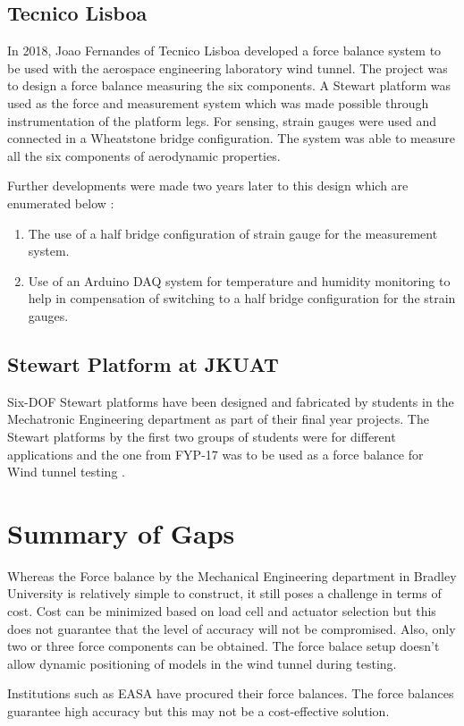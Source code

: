 \subsection{Tecnico Lisboa}
In 2018, Joao Fernandes of Tecnico Lisboa developed a force balance system to
be used with the aerospace engineering laboratory wind tunnel. The project was to
design a force balance measuring the six components. A Stewart platform was used as the
force and measurement system which was made possible through instrumentation of the platform legs.
For sensing, strain gauges were used and connected in a Wheatstone bridge configuration.
The system was able to measure all the six components of aerodynamic properties\cite{ferreira2015design}.

Further developments were made two years later to this design which are enumerated below \cite{ferreira2015design}:
\begin{enumerate}
\item The use of a half bridge configuration of strain gauge for the measurement system.
\item Use of an Arduino DAQ system for temperature and humidity monitoring to help in
compensation of switching to a half bridge configuration for the strain gauges.
\end{enumerate}
\subsection{Stewart Platform at JKUAT}
Six-DOF Stewart platforms have been designed and fabricated by students in the Mechatronic Engineering department as part of their final year projects. The Stewart platforms by the first two groups of students were for different applications and the one from FYP-17 was to be used as a force balance for Wind tunnel testing \cite{caleb}. 
\section{Summary of Gaps}
Whereas the Force balance by the Mechanical Engineering department in Bradley University is relatively simple to construct, it still poses a challenge in terms of cost. Cost can be minimized based on load cell and actuator selection but this does not guarantee that the level of accuracy will not be compromised. Also, only two or three force components can be obtained. The force balace setup doesn't allow dynamic positioning of models in the wind tunnel during testing.

Institutions such as EASA have procured their force balances. The force balances guarantee high accuracy but this may not be a cost-effective solution.

